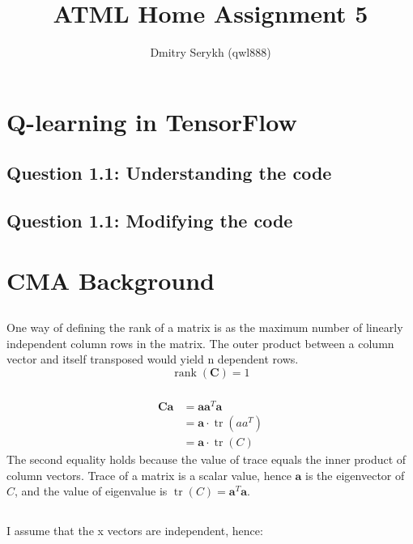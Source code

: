 \documentclass[a4paper]{article}
\title{\vspace{-5cm}ATML Home Assignment 5}
\author{Dmitry Serykh (qwl888)}
\newcommand*{\bs}[1]{\boldsymbol{#1}}
\begin{document}
\maketitle

\section{Q-learning in TensorFlow}
\label{sec:1}
\subsection*{Question 1.1: Understanding the code}
\label{subsec:11}

\subsection*{Question 1.1: Modifying the code}
\label{subsec:12}


\section{CMA Background}
\label{sec:2}
\subsection{}
\label{subsec:21}
\subsubsection{}
One way of defining the rank of a matrix is as the maximum number of linearly independent
column rows in the matrix. The outer product
between a column vector and itself transposed would yield n dependent rows.
\[
\operatorname{rank}(\boldsymbol{C}) = 1
\]
\subsubsection{}
\begin{align*}
  \bs{Ca}
  &=\bs{aa}^T\bs{a}\\
  &=\bs{a}\cdot\operatorname{tr}(aa^T)\\
  &=\bs{a}\cdot\operatorname{tr}(C) 
\end{align*}
The second equality holds because the value of trace equals the inner product of
column vectors.
Trace of a matrix is a scalar value, hence $\bs{a}$ is the eigenvector of $C$,
and the value of eigenvalue is $\operatorname{tr}(C) = \bs{a}^T\bs{a}$.

\subsection{}
\label{subsec:22}
I assume that the x vectors are independent, hence:
\end{document}
